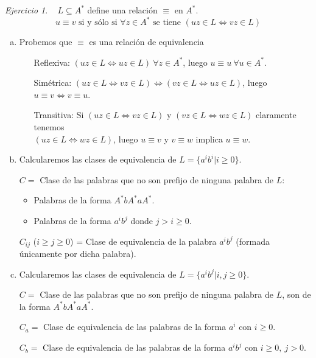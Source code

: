 \documentclass[12pt,spanish]{article}
\theoremstyle{definition}
\theoremstyle{remark}
\newtheorem{exercise}{Ejercicio}%
\begin{document}
\begin{exercise}~ $L\subseteq A^*$ define una relación $\equiv$ en
  $A^*$.
  \[u\equiv v \text{ si y sólo si } \forall z\in A^* \text{ se tiene }
    (uz\in L \Leftrightarrow vz \in L)\]

  \begin{enumerate}[a)]
  \item Probemos que $\equiv$ es una relación de equivalencia
    \begin{enumerate}
    \item[Reflexiva:]
      $(uz\in L \Leftrightarrow uz \in L) \ \forall z\in A^*$, luego
      $u\equiv u \ \forall u\in A^*$.
    \item[Simétrica:]
      $(uz\in L \Leftrightarrow vz \in L) \Leftrightarrow (vz\in L
      \Leftrightarrow uz \in L)$, luego
      $u\equiv v \Leftrightarrow v\equiv u$.
    \item[Transitiva:] Si $(uz\in L \Leftrightarrow vz \in L)$ y
      $(vz\in L \Leftrightarrow wz \in L)$ claramente tenemos \\
      $(uz\in L \Leftrightarrow wz \in L)$, luego $u\equiv v$ y
      $v\equiv w$ implica $u\equiv w$.      
    \end{enumerate}

  \item Calcularemos las clases de equivalencia de
    $L=\{a^ib^i|i\geq 0\}$.

    $C=$ Clase de las palabras que no son prefijo de ninguna palabra
    de $L$:
    \begin{itemize}
    \item Palabras de la forma $A^*bA^*aA^*$.
    \item Palabras de la forma $a^ib^j$ donde $j>i\geq 0$.
    \end{itemize}
    
    $C_{ij}$ ($i \geq j \geq 0$) = Clase de equivalencia de la
    palabra $a^ib^j$ (formada únicamente por dicha palabra).

  \item Calcularemos las clases de equivalencia de
    $L=\{a^ib^j|i,j\geq 0\}$.

    $C=$ Clase de las palabras que no son prefijo de ninguna palabra
    de $L$, son de la forma $A^*bA^*aA^*$.
    
    $C_a=$ Clase de equivalencia de las palabras de la forma $a^i$ con
    $i\geq 0$.

    $C_b=$ Clase de equivalencia de las palabras de la forma $a^ib^j$
    con $i\geq 0, \ j>0$.


\end{enumerate}
\end{exercise}
\end{document}
